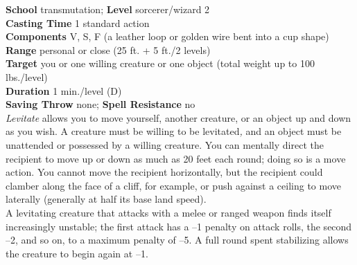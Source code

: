 \textbf{School} transmutation; \textbf{Level} sorcerer/wizard 2\\
\textbf{Casting Time} 1 standard action\\
\textbf{Components} V, S, F (a leather loop or golden wire bent into a cup shape)\\
\textbf{Range} personal or close (25 ft. + 5 ft./2 levels)\\
\textbf{Target} you or one willing creature or one object (total weight up to 100 lbs./level)\\
\textbf{Duration} 1 min./level (D)\\
\textbf{Saving Throw} none; \textbf{Spell Resistance} no\\
\textit{Levitate }allows you to move yourself, another creature, or an object up and down as you wish. A creature must be willing to be levitated\textit{, }and an object must be unattended or possessed by a willing creature. You can mentally direct the recipient to move up or down as much as 20 feet each round; doing so is a move action. You cannot move the recipient horizontally, but the recipient could clamber along the face of a cliff, for example, or push against a ceiling to move laterally (generally at half its base land speed).\\
A levitating creature that attacks with a melee or ranged weapon finds itself increasingly unstable; the first attack has a --1 penalty on attack rolls, the second --2, and so on, to a maximum penalty of --5. A full round spent stabilizing allows the creature to begin again at --1.\\
